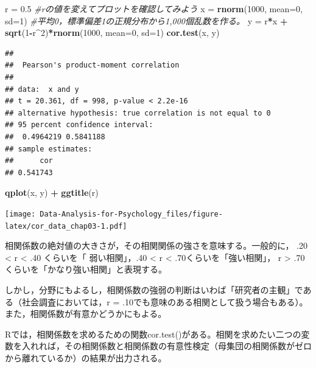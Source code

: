 \documentclass[]{article}
\newenvironment{Shaded}{\begin{snugshade}}{\end{snugshade}}
\newcommand{\KeywordTok}[1]{\textcolor[rgb]{0.13,0.29,0.53}{\textbf{#1}}}
\newcommand{\DataTypeTok}[1]{\textcolor[rgb]{0.13,0.29,0.53}{#1}}
\newcommand{\DecValTok}[1]{\textcolor[rgb]{0.00,0.00,0.81}{#1}}
\newcommand{\FloatTok}[1]{\textcolor[rgb]{0.00,0.00,0.81}{#1}}
\newcommand{\StringTok}[1]{\textcolor[rgb]{0.31,0.60,0.02}{#1}}
\newcommand{\CommentTok}[1]{\textcolor[rgb]{0.56,0.35,0.01}{\textit{#1}}}
\newcommand{\OperatorTok}[1]{\textcolor[rgb]{0.81,0.36,0.00}{\textbf{#1}}}
\newcommand{\NormalTok}[1]{#1}
\begin{document}
\begin{Shaded}
\begin{Highlighting}[]
\NormalTok{r =}\StringTok{ }\FloatTok{0.5} \CommentTok{#rの値を変えてプロットを確認してみよう}
\NormalTok{x =}\StringTok{ }\KeywordTok{rnorm}\NormalTok{(}\DecValTok{1000}\NormalTok{, }\DataTypeTok{mean=}\DecValTok{0}\NormalTok{, }\DataTypeTok{sd=}\DecValTok{1}\NormalTok{) }\CommentTok{#平均0，標準偏差1の正規分布から1,000個乱数を作る。}
\NormalTok{y =}\StringTok{ }\NormalTok{r}\OperatorTok{*}\NormalTok{x }\OperatorTok{+}\StringTok{ }\KeywordTok{sqrt}\NormalTok{(}\DecValTok{1}\OperatorTok{-}\NormalTok{r}\OperatorTok{^}\DecValTok{2}\NormalTok{)}\OperatorTok{*}\KeywordTok{rnorm}\NormalTok{(}\DecValTok{1000}\NormalTok{, }\DataTypeTok{mean=}\DecValTok{0}\NormalTok{, }\DataTypeTok{sd=}\DecValTok{1}\NormalTok{)}
\KeywordTok{cor.test}\NormalTok{(x, y)}
\end{Highlighting}
\end{Shaded}

\begin{verbatim}
## 
##  Pearson's product-moment correlation
## 
## data:  x and y
## t = 20.361, df = 998, p-value < 2.2e-16
## alternative hypothesis: true correlation is not equal to 0
## 95 percent confidence interval:
##  0.4964219 0.5841188
## sample estimates:
##      cor 
## 0.541743
\end{verbatim}

\begin{Shaded}
\begin{Highlighting}[]
\KeywordTok{qplot}\NormalTok{(x, y) }\OperatorTok{+}\StringTok{ }\KeywordTok{ggtitle}\NormalTok{(r)}
\end{Highlighting}
\end{Shaded}

\texttt{[image: Data-Analysis-for-Psychology\_files/figure-latex/cor\_data\_chap03-1.pdf]}

相関係数の絶対値の大きさが，その相関関係の強さを意味する。一般的に， .20
\textless{} \textbar{}r\textbar{} \textless{} .40 くらいを「
弱い相関」，.40 \textless{} \textbar{}r\textbar{} \textless{}
.70くらいを「強い相関」， \textbar{}r\textbar{} \textgreater{} .70
くらいを「かなり強い相関」と表現する。

しかし，分野にもよるし，相関係数の強弱の判断はいわば「研究者の主観」である（社会調査においては，\textbar{}r\textbar{}
=
.10でも意味のある相関として扱う場合もある）。また，相関係数が有意かどうかにもよる。

Rでは，相関係数を求めるための関数cor.test()がある。相関を求めたい二つの変数を入れれば，その相関係数と相関係数の有意性検定（母集団の相関係数がゼロから離れているか）の結果が出力される。
\end{document}

